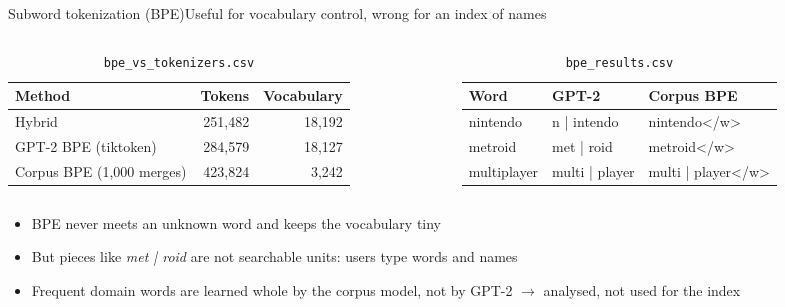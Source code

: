 \documentclass[
  aspectratio=169,
  10pt,
  t,
]{beamer}
\begin{document}
\begin{frame}{Subword tokenization (BPE)}{Useful for vocabulary control, wrong for an index of names}
\begin{columns}[T]
\begin{column}{.48\textwidth}
\begin{table}
\footnotesize
\begin{tabular}{lrr}
\toprule
Method & Tokens & Vocabulary \\
\midrule
Hybrid & 251,482 & 18,192 \\
GPT-2 BPE (tiktoken) & 284,579 & 18,127 \\
Corpus BPE (1,000 merges) & 423,824 & \alert{3,242} \\
\bottomrule
\end{tabular}
\caption{\texttt{bpe\_vs\_tokenizers.csv}}
\end{table}
\end{column}
\begin{column}{.48\textwidth}
\begin{table}
\footnotesize
\begin{tabular}{lll}
\toprule
Word & GPT-2 & Corpus BPE \\
\midrule
nintendo & n | intendo & nintendo\textless/w\textgreater \\
metroid & met | roid & metroid\textless/w\textgreater \\
multiplayer & multi | player & multi | player\textless/w\textgreater \\
\bottomrule
\end{tabular}
\caption{\texttt{bpe\_results.csv}}
\end{table}
\end{column}
\end{columns}
\begin{itemize}
  \item BPE \parencite{sennrich2016bpe} never meets an unknown word and keeps the vocabulary tiny
  \item But pieces like \emph{met | roid} are not searchable units: users type words and names
  \item Frequent domain words are learned whole by the corpus model, not by GPT-2 \(\rightarrow\) \alert{analysed, not used for the index}
\end{itemize}
\end{frame}
\end{document}

